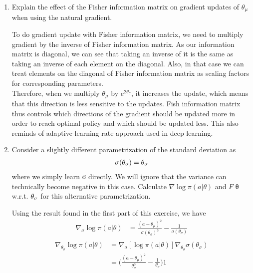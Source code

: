 \documentclass{exam}
\begin{document}
\begin{enumerate}
\begin{solutionorlines}[2in]
        \end{solutionorlines}
    \item Explain the effect of the Fisher information matrix on gradient updates of $\theta_{\mu}$ when using the natural gradient.
        \begin{solutionorlines}[2in]
            To do gradient update with Fisher information matrix, we need to multiply gradient by the inverse of Fisher information matrix. As our information matrix is diagonal, we can see that taking an inverse of it is the same as taking an inverse of each element on the diagonal. Also, in that case we can treat elements on the diagonal of Fisher information matrix as scaling factors for corresponding parameters.\\
            
            Therefore, when we multiply $\theta_{\mu}$ by $e^{2\theta_\sigma}$, it increases the update, which means that this direction is less sensitive to the updates. Fish information matrix thus controls which directions of the gradient should be updated more in order to reach optimal policy and which should be updated less. This also reminds of adaptive learning rate approach used in deep learning.  
        \end{solutionorlines}
    \item Consider a slightly different parametrization of the standard deviation as 
    \begin{align*}
        \sigma(\theta_{\sigma}) = \theta_{\sigma}
    \end{align*}
    where we simply learn σ directly. We will ignore that the variance can technically become negative in this case. Calculate $\nabla  \log \pi (a | \theta)$ and $F$ θ w.r.t. $\theta_{\sigma}$ for this alternative parametrization.
        \begin{solutionorlines}[2in]
            Using the result found in the first part of this exercise, we have  
            \begin{align*}
                \nabla_{\sigma} \log \pi(a | \theta) &= \frac{(a - \theta_{\mu})^2}{\sigma(\theta_{\sigma})^3} - \frac{1}{\sigma(\theta_{\sigma}) } \\
            \end{align*}
            \begin{align*}
                \nabla_{\theta_\sigma} \log \pi(a | \theta) &= \nabla_{\sigma} [\log \pi(a | \theta) ] \nabla_{\theta_{\sigma}} \sigma(\theta_{\sigma}) \\
                &= \bigg( \frac{(a - \theta_{\mu})^2}{\theta_{\sigma}^3} - \frac{1}{\theta_{\sigma} } \bigg)  1 \\

\end{align*}
\end{solutionorlines}
\end{enumerate}
\end{document}
